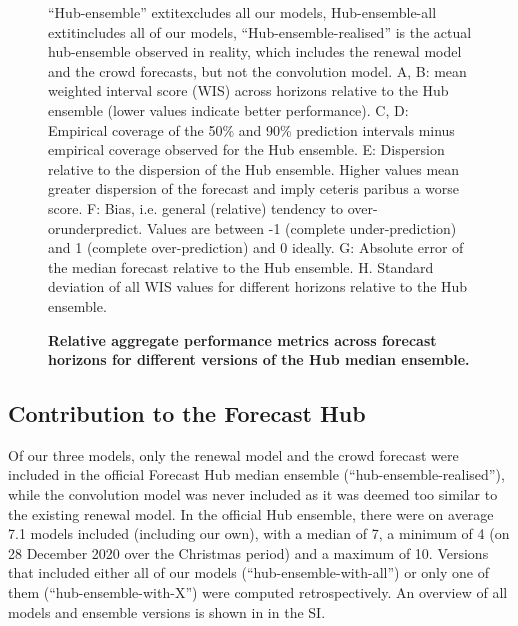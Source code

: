 \documentclass[10pt,letterpaper]{article}
\begin{document}
\begin{figure}[H]
\caption{\bf{Relative aggregate performance metrics across forecast horizons for different versions of the Hub median ensemble.}}
“Hub-ensemble”  extit{excludes} all our models, Hub-ensemble-all    extit{includes} all of our models, “Hub-ensemble-realised” is the actual hub-ensemble observed in reality, which includes the renewal model and the crowd forecasts, but not the convolution model. A, B: mean weighted interval score (WIS) across horizons relative to the Hub ensemble (lower values indicate better performance). C, D: Empirical coverage of the 50\% and 90\% prediction intervals minus empirical coverage observed for the Hub ensemble. E: Dispersion relative to the dispersion of the Hub ensemble. Higher values mean greater dispersion of the forecast and imply ceteris paribus a worse score. F: Bias, i.e. general (relative) tendency to over- orunderpredict. Values are between -1 (complete under-prediction) and 1 (complete over-prediction) and 0 ideally. G: Absolute error of the median forecast relative to the Hub ensemble. H. Standard deviation of all WIS values for different horizons relative to the Hub ensemble.
\label{fig:agg-performance-ensemble-rel}
\end{figure}

\hypertarget{contribution-to-the-forecast-hub}{%
\subsection{Contribution to the Forecast
Hub}\label{contribution-to-the-forecast-hub}}

\label{contributions-hub}

Of our three models, only the renewal model and the crowd forecast were
included in the official Forecast Hub median ensemble
(``hub-ensemble-realised''), while the convolution model was never
included as it was deemed too similar to the existing renewal model. In
the official Hub ensemble, there were on average 7.1 models included
(including our own), with a median of 7, a minimum of 4 (on 28 December
2020 over the Christmas period) and a maximum of 10. Versions that
included either all of our models (``hub-ensemble-with-all'') or only
one of them (``hub-ensemble-with-X'') were computed retrospectively. An
overview of all models and ensemble versions is shown in
 in the SI.
\end{document}
